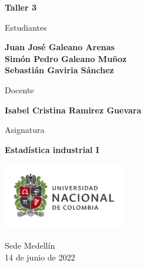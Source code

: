 \begin{titlepage}
   \Large{
   \begin{center}
       \vspace*{1cm}

       \textbf{Taller 3}

            
       \vspace{1.5cm}
       
       Estudiantes
       
       \vspace{0.5cm}
        
	\textbf{Juan José Galeano Arenas} \\   

       \textbf{Simón Pedro Galeano Muñoz} \\

	\textbf{Sebastián Gaviria Sánchez}

              \vspace{1cm}
       
       Docente
       
       \vspace{0.5cm}

       \textbf{Isabel Cristina Ramirez Guevara}
       
       \vspace{0.4cm}

       \vspace{1.4cm}
       
       Asignatura
       
       \vspace{0.5cm}

       \textbf{Estadística industrial I}

       \vfill

            
       \vspace{0.4cm}
     
       \includegraphics[width=0.4\textwidth]{logounal.png}
            
       Sede Medellín\\
       14 de junio de 2022
       
   \end{center}
   }
\end{titlepage}